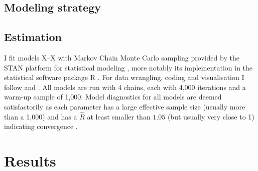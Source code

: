 \documentclass[11pt,parskip,abstracton,notitlepage, dvipsnames]{scrartcl}
\begin{document}
\subsection{Modeling strategy}

\subsection{Estimation}

I fit models X--X with Markov Chain Monte Carlo sampling provided by the STAN platform for statistical modeling \citep{gelman2015stan}, more notably its implementation in the statistical software package R \citep{r2021, rstan2020}. For data wrangling, coding and visualisation I follow \citet{mcelreath2020statistical} and \citet{kurzStatisticalRethinkingSecondEd2021}. All models are run with 4 chains, each with 4,000 iterations and a warm-up sample of 1,000. Model diagnostics for all models are deemed satisfactorily as each parameter has a large effective sample size (usually more than a 1,000) and has a $\widehat{R}$ at least smaller than $1.05$ (but usually very close to 1) indicating convergence \citep{vehtari2019rank}.

\section{Results}
\end{document}
